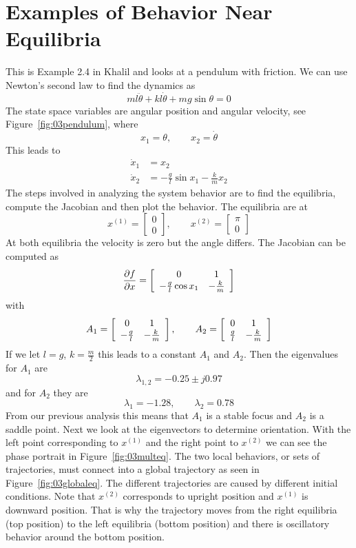\section{Examples of Behavior Near Equilibria}
\begin{example}
\label{ex:03pendulum}
This is Example 2.4 in Khalil and looks at a pendulum with friction. We can use Newton's second law to find the dynamics as
$$ml\ddot{\theta} + kl\dot{\theta} + mg\sin\theta = 0$$
The state space variables are angular position and angular velocity, see Figure~\ref{fig:03pendulum}, where
$$ x_1 = \theta, \qquad x_2 = \dot{\theta}$$
This leads to
\begin{align*}
\dot{x}_1 &= x_2 \\
\dot{x}_2 &= -\tfrac{g}{l}\sin x_1 - \tfrac{k}{m}x_2
\end{align*}
The steps involved in analyzing the system behavior are to find the equilibria, compute the Jacobian and then plot the behavior. The equilibria are at
$$x^{(1)} = \left[\begin{array}{c} 0 \\ 0 \end{array}\right], \qquad x^{(2)} = \left[\begin{array}{c} \pi \\ 0 \end{array}\right]$$
At both equilibria the velocity is zero but the angle differs. The Jacobian can be computed as
$$\frac{\partial{} f}{\partial{} x} = \left[\begin{array}{c c} 0 & 1 \\ -\tfrac{g}{l}\cos x_1 & -\tfrac{k}{m} \end{array}\right]$$
with
$$A_1 = \left[\begin{array}{c c} 0 & 1 \\ -\tfrac{g}{l} & -\tfrac{k}{m} \end{array}\right], \qquad A_2 = \left[\begin{array}{c c} 0 & 1 \\ \tfrac{g}{l} & -\tfrac{k}{m} \end{array}\right]$$
If we let $l=g$, $k=\tfrac{m}{2}$ this leads to a constant $A_1$ and $A_2$. Then the eigenvalues for $A_1$ are
$$\lambda_{1,2} = -0.25\pm{} j0.97$$
and for $A_2$ they are
$$\lambda_1 = -1.28, \qquad \lambda_2 = 0.78$$
From our previous analysis this means that $A_1$ is a stable focus and $A_2$ is a saddle point. Next we look at the eigenvectors to determine orientation. With the left point corresponding to $x^{(1)}$ and the right point to $x^{(2)}$ we can see the phase portrait in Figure~\ref{fig:03multeq}. The two local behaviors, or sets of trajectories, must connect into a global trajectory as seen in Figure~\ref{fig:03globaleq}. The different trajectories are caused by different initial conditions. Note that $x^{(2)}$ corresponds to upright position and $x^{(1)}$ is downward position. That is why the trajectory moves from the right equilibria (top position) to the left equilibria (bottom position) and there is oscillatory behavior around the bottom position.


\end{example}
